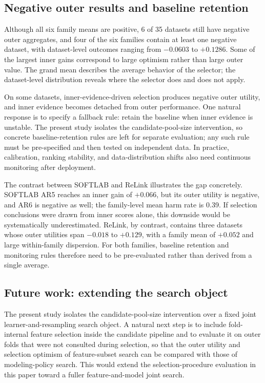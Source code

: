 \documentclass[referee]{USG}
\begin{document}
\subsection{Negative outer results and baseline retention}
Although all six family means are positive, 6 of 35 datasets still have negative outer aggregates, and four of the six families contain at least one negative dataset, with dataset-level outcomes ranging from $-0.0603$ to $+0.1286$. Some of the largest inner gains correspond to large optimism rather than large outer value. The grand mean describes the average behavior of the selector; the dataset-level distribution reveals where the selector does and does not apply.

On some datasets, inner-evidence-driven selection produces negative outer utility, and inner evidence becomes detached from outer performance. One natural response is to specify a fallback rule: retain the baseline when inner evidence is unstable. The present study isolates the candidate-pool-size intervention, so concrete baseline-retention rules are left for separate evaluation; any such rule must be pre-specified and then tested on independent data. In practice, calibration, ranking stability, and data-distribution shifts also need continuous monitoring after deployment.

The contrast between SOFTLAB and ReLink illustrates the gap concretely. SOFTLAB AR5 reaches an inner gain of $+0.066$, but its outer utility is negative, and AR6 is negative as well; the family-level mean harm rate is 0.39. If selection conclusions were drawn from inner scores alone, this downside would be systematically underestimated. ReLink, by contrast, contains three datasets whose outer utilities span $-0.018$ to $+0.129$, with a family mean of $+0.052$ and large within-family dispersion. For both families, baseline retention and monitoring rules therefore need to be pre-evaluated rather than derived from a single average.

\subsection{Future work: extending the search object}
The present study isolates the candidate-pool-size intervention over a fixed joint learner-and-resampling search object. A natural next step is to include fold-internal feature selection inside the candidate pipeline and to evaluate it on outer folds that were not consulted during selection, so that the outer utility and selection optimism of feature-subset search can be compared with those of modeling-policy search. This would extend the selection-procedure evaluation in this paper toward a fuller feature-and-model joint search.
\end{document}

